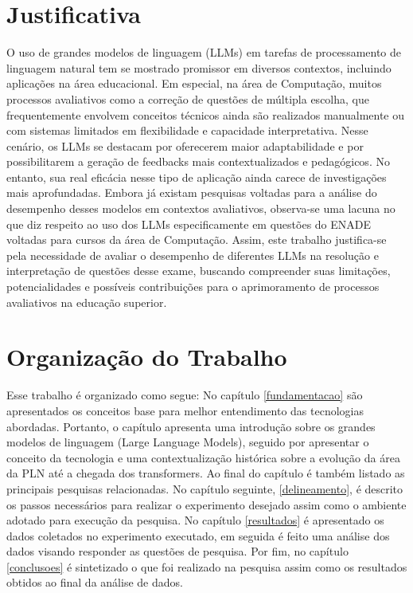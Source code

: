 \section{Justificativa}
O uso de grandes modelos de linguagem (LLMs) em tarefas de processamento de linguagem natural tem se mostrado promissor em diversos contextos, incluindo aplicações na área educacional. Em especial, na área de Computação, muitos processos avaliativos como a correção de questões de múltipla escolha, que frequentemente envolvem conceitos técnicos  ainda são realizados manualmente ou com sistemas limitados em flexibilidade e capacidade interpretativa. Nesse cenário, os LLMs se destacam por oferecerem maior adaptabilidade e por possibilitarem a geração de feedbacks mais contextualizados e pedagógicos. No entanto, sua real eficácia nesse tipo de aplicação ainda carece de investigações mais aprofundadas. Embora já existam pesquisas voltadas para a análise do desempenho desses modelos em contextos avaliativos, observa-se uma lacuna no que diz respeito ao uso dos LLMs especificamente em questões do ENADE voltadas para cursos da área de Computação. Assim, este trabalho justifica-se pela necessidade de avaliar o desempenho de diferentes LLMs na resolução e interpretação de questões desse exame, buscando compreender suas limitações, potencialidades e possíveis contribuições para o aprimoramento de processos avaliativos na educação superior.

\section{Organização do Trabalho}

Esse trabalho é organizado como segue: No capítulo \ref{fundamentacao} são apresentados os conceitos base para melhor entendimento das tecnologias abordadas. Portanto, o capítulo apresenta uma introdução sobre os grandes modelos de linguagem (Large Language Models), seguido por apresentar o conceito da tecnologia e uma contextualização histórica sobre a evolução da área da PLN até a chegada dos transformers. Ao final do capítulo é também listado as principais pesquisas relacionadas. No capítulo seguinte, \ref{delineamento}, é descrito os passos necessários para realizar o experimento desejado assim como o ambiente adotado para execução da pesquisa. No capítulo \ref{resultados} é apresentado os dados coletados no experimento executado, em seguida é feito uma análise dos dados visando responder as questões de pesquisa. Por fim, no capítulo \ref{conclusoes} é sintetizado o que foi realizado na pesquisa assim como os resultados obtidos ao final da análise de dados.

